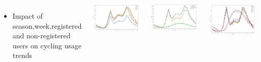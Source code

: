 \documentclass{tikzposter} %
\begin{document}
\begin{columns}
{    \begin{itemize}                            
        \item
        Impact of season,week,registered and non-registered users on cycling usage trends
    \end{itemize}
    \begin{minipage}{0.33\linewidth}
        \centering
        \includegraphics[width=1\textwidth]{pic1/three hour1.png} 
    \end{minipage}
    \begin{minipage}{0.33\linewidth}
        \centering
        \includegraphics[width=1\textwidth]{pic1/three hour3.png} 
    \end{minipage}
    \begin{minipage}{0.33\linewidth}
        \centering
        \includegraphics[width=1\textwidth]{pic1/three hour2.png} 
    \end{minipage}

}
\end{columns}
\end{document}
